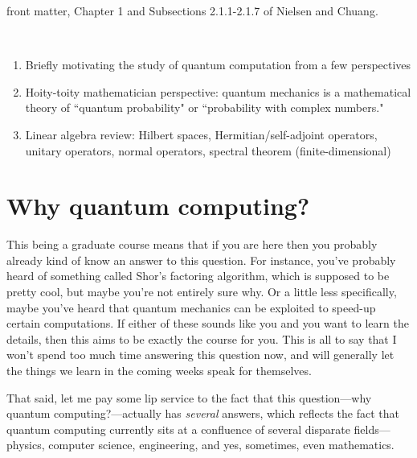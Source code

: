\documentclass{article}
\begin{document}
\noindent
\fbox{
	\parbox{\linewidth}{
		\vspace{-.3cm}
{\bf \Large \begin{center}
CS 593/MA 592 - Intro to Quantum Computing \\
Spring 2024 \\
Tuesday, January 9 - Lecture 1.1
\end{center}}
\vspace{-.3cm}
	}
}

\vspace{.3cm}

 front matter, Chapter 1 and Subsections 2.1.1-2.1.7 of Nielsen and Chuang.

\

\begin{enumerate}
	\item Briefly motivating the study of quantum computation from a few perspectives
	\item Hoity-toity mathematician perspective: quantum mechanics is a mathematical theory of ``quantum probability" or ``probability with complex numbers."
	\item Linear algebra review: Hilbert spaces, Hermitian/self-adjoint operators, unitary operators, normal operators, spectral theorem (finite-dimensional)
\end{enumerate}

\section{Why quantum computing?}
This being a graduate course means that if you are here then you probably already kind of know an answer to this question.  For instance, you've probably heard of something called Shor's factoring algorithm, which is supposed to be pretty cool, but maybe you're not entirely sure why.  Or a little less specifically, maybe you've heard that quantum mechanics can be exploited to speed-up certain computations.  If either of these sounds like you and you want to learn the details, then this aims to be exactly the course for you.  This is all to say that I won't spend too much time answering this question now, and will generally let the things we learn in the coming weeks speak for themselves.

That said, let me pay some lip service to the fact that this question---why quantum computing?---actually has \emph{several} answers, which reflects the fact that quantum computing currently sits at a confluence of several disparate fields---physics, computer science, engineering, and yes, sometimes, even mathematics.
\end{document}
